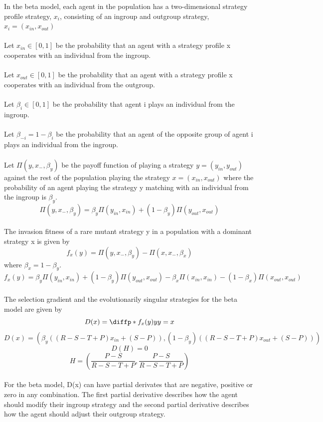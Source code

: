 \documentclass[]{llncs}
\begin{document}
In the beta model, each agent in the population has a two-dimensional strategy profile strategy, $x_i$, consisting of an ingroup and outgroup strategy,  $x_i = (x_{in}, x_{out})$\\
\\
Let $x_{in} \in [0,1]$ be the probability that an agent with a strategy profile x cooperates with an individual from the ingroup. \\
\\
Let $x_{out} \in [0,1]$ be the probability that an agent with a strategy profile x cooperates with an individual from the outgroup. \\
\\
Let $\beta_i \in [0,1]$ be the probability that agent i plays an individual from the ingroup.\\
\\
Let $\beta_{-i} = 1 -\beta_i $ be the probability that an agent of the opposite group of agent i plays an individual from the ingroup.\\
\\
Let $ \Pi ( y, x_{-}, \beta_y)$ be the payoff function of playing a strategy $y = (y_{in}, y_{out}) $ against the rest of the population playing the strategy $x = (x_{in}, x_{out})$ where the probability of an agent playing the strategy y matching with an individual from the ingroup is $\beta_y$.
\[
\Pi ( y, x_{-} , \beta_y) = \beta_y \Pi ( y_{in}, x_{in}) + (1-\beta_y) \Pi ( y_{out}, x_{out} ) 
\]
\\
The invasion fitness of a rare mutant strategy y in a population with a dominant strategy x is given by 
\[
f_x(y) = \Pi ( y, x_{-} , \beta_y) - \Pi ( x, x_{-} , \beta_x) 
\]
where $\beta_x = 1 - \beta_y.$
\[
f_x(y) = \beta_y \Pi ( y_{in}, x_{in}) + (1-\beta_y) \Pi ( y_{out}, x_{out} )  - \beta_x \Pi ( x_{in}, x_{in}) - (1-\beta_x) \Pi ( x_{out}, x_{out} ) 
\]
\\
The selection gradient and the evolutionarily singular strategies for the beta model are given by 
\[
D(x) = \diffp*{f_x(y)}{y}{y=x}
\]
\[
D(x) = (\beta_y((R - S - T + P) x_{in} + (S-P)), (1-\beta_y)((R - S - T + P) x_{out} + (S-P)))
\]
\[
D(H) = 0 
\]
\[
H = (\frac{P-S}{R - S - T +P}, \frac{P-S}{R - S - T +P}) 
\]
\\
For the beta model, D(x) can have partial derivates that are negative, positive or zero in any combination. The first partial derivative describes how the agent should modify their ingroup strategy and the second partial derivative describes how the agent should adjust their outgroup strategy. 
\end{document}
